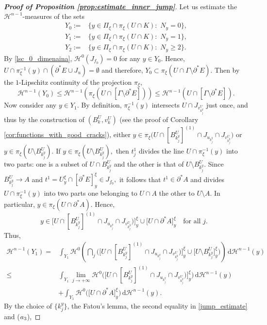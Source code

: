 \documentclass[reqno]{amsart}
\numberwithin{equation}{section}
\theoremstyle{plain}
\theoremstyle{definition}
\newcommand{\cH}{\mathcal{H}}
\newcommand{\p}{\partial}
\renewcommand{\d}{\mathrm{d}}
\begin{document}
\begin{proof}[\textbf{Proof of Proposition \ref{prop:estimate_inner_jump}}]
Let us estimate the $\cH^{n-1}$-measures of the sets 
\begin{align*}
Y_0:= & \{y\in \Pi_\xi\cap \pi_\xi(U\cap K):\,\, N_y=0\},\\
Y_1:= & \{y\in \Pi_\xi\cap \pi_\xi(U\cap K):\,\, N_y=1\},\\
Y_2:= & \{y\in \Pi_\xi\cap \pi_\xi(U\cap K):\,\, N_y\ge2\}.
\end{align*}
%
By \eqref{lsc_0_dimenaina}, $\cH^0(J_{f_0})=0$ for any $y\in Y_0.$ Hence, $U\cap \pi_\xi^{-1}(y)\cap (\p^*E \cup J_u)=\emptyset$ and therefore,
$
Y_0\subset \pi_\xi(U\cap \Gamma\setminus \p^*E).
$
Then by the $1$-Lipschitz continuity of the projection $\pi_\xi,$
\begin{equation}\label{est_Y0_9142}
\cH^{n-1}(Y_0) \le \cH^{n-1}(\pi_\xi(U \cap [\Gamma\setminus \p^*E])) 
\le \cH^{n-1}(U \cap [\Gamma\setminus \p^*E]).  
\end{equation}
Now consider any $y\in Y_1.$ By definition, $\pi_\xi^{-1}(y)$ intersects $U\cap J_{v_{k_j^y}^U}$ just once, and thus by the construction of  $(B_k^U,v_k^U)$ (see the proof of Corollary \ref{cor:functions_with_good_cracks}), either
$
y\in \pi_\xi\big(U\cap [B_{k_j^y}^U]^{(1)}\cap J_{u_{k_j^y}}\cap J_{v_{k_j^y}^U}\big)
$
or 
$
y\in \pi_\xi(U\setminus B_{k_j^y}^U).
$
If $y\in \pi_\xi(U\setminus B_{k_j^y}^U),$ then $t_j^1$ divides the line $U\cap \pi_\xi^{-1}(y)$ into two parts: one is a subset of $U\cap B_{k_j^y}^U$ and the other is that of $U\setminus B_{k_j^y}^U.$ Since $B_{k_j^y}^U \to A$ and $t^1=U_y^\xi\cap [\p^* E]_y^\xi \in J_{f_0},$ it follows that $t^1\in \p^*A$ and divides $U\cap \pi_\xi^{-1}(y)$ into two parts one belonging to $U\cap A$ the other to $U\setminus A.$ In particular, $y\in \pi_\xi(U\cap \p^*A).$
Hence,
$$
y\in\Big[U\cap [B_{k_j^y}^U]^{(1)}\cap J_{u_{k_j^y}}\cap J_{v_{k_j^y}^U})\Big]_y^\xi \cup \Big[U\cap \p^*A\Big]_y^\xi \quad \text{for all $j.$ }
$$
Thus,
\begin{align*}
\cH^{n-1}(Y_1) =  & \int_{Y_1} \cH^0\left(
\bigcap_j\Big( \Big[U\cap [B_{k_j^y}^U]^{(1)}\cap J_{u_{k_j^y}}\cap J_{v_{k_j^y}^U})\Big]_y^\xi \cup \Big[U\setminus B_{k_j^y}^U\Big]_y^\xi \Big)\right)\, \d\cH^{n-1}(y)\\
\le &
\int_{Y_1} \lim \limits_{j\to+\infty} \cH^0\Big(\Big[U\cap [B_{k_j^y}^U]^{(1)}\cap J_{u_{k_j^y}}\cap J_{v_{k_j^y}^U})\Big]_y^\xi\Big) \,\d\cH^{n-1}(y)\\
& +
\int_{Y_1} \cH^0\Big(\Big[U\cap\p^*A\Big]_y^\xi \Big)\, \d\cH^{n-1}(y).
\end{align*}
By the choice of $\{k_j^y\}$, the Fatou's lemma, the second equality in \eqref{jump_estimate} and ($\rm a_3$),

\end{proof}
\end{document}
